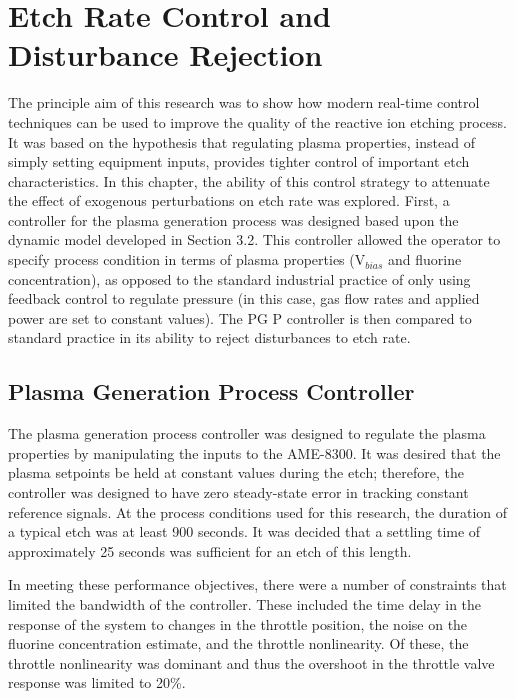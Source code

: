 \chapter{Etch Rate Control and Disturbance Rejection}

\tab The principle aim of this research was to show how modern real-time control techniques can be used to improve the quality of the reactive ion etching process. It was based on the hypothesis that regulating plasma properties, instead of simply setting equipment inputs, provides tighter control of important etch characteristics. In this chapter, the ability of this control strategy to attenuate the effect of exogenous perturbations on etch rate was explored. First, a controller for the plasma generation process was designed based upon the dynamic model developed in Section 3.2. This controller allowed the operator to specify process condition in terms of plasma properties ($\text{V}_{bias}$ and fluorine concentration), as opposed to the standard industrial practice of only using feedback control to regulate pressure (in this case, gas flow rates and applied power are set to constant values). The PG P controller is then compared to standard practice in its ability to reject disturbances to etch rate.

\section{Plasma Generation Process Controller}

\tab The plasma generation process controller was designed to regulate the plasma properties by manipulating the inputs to the AME-8300. It was desired that the plasma setpoints be held at constant values during the etch; therefore, the controller was designed to have zero steady-state error in tracking constant reference signals. At the process conditions used for this research, the duration of a typical etch was at least 900 seconds. It was decided that a settling time of approximately 25 seconds was sufficient for an etch of this length.


In meeting these performance objectives, there were a number of constraints that limited the bandwidth of the controller. These included the time delay in the response of the system to changes in the throttle position, the noise on the fluorine concentration estimate, and the throttle nonlinearity. Of these, the throttle nonlinearity was dominant and thus the overshoot in the throttle valve response was limited to 20\%.

